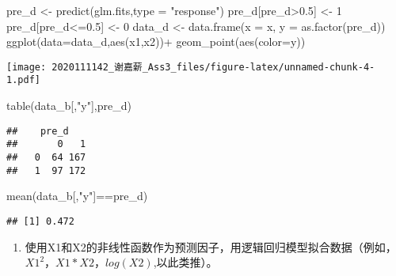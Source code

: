 \documentclass[
]{article}
\newenvironment{Shaded}{\begin{snugshade}}{\end{snugshade}}
\newcommand{\AttributeTok}[1]{\textcolor[rgb]{0.77,0.63,0.00}{#1}}
\newcommand{\DecValTok}[1]{\textcolor[rgb]{0.00,0.00,0.81}{#1}}
\newcommand{\FloatTok}[1]{\textcolor[rgb]{0.00,0.00,0.81}{#1}}
\newcommand{\FunctionTok}[1]{\textcolor[rgb]{0.00,0.00,0.00}{#1}}
\newcommand{\NormalTok}[1]{#1}
\newcommand{\OtherTok}[1]{\textcolor[rgb]{0.56,0.35,0.01}{#1}}
\newcommand{\SpecialCharTok}[1]{\textcolor[rgb]{0.00,0.00,0.00}{#1}}
\newcommand{\StringTok}[1]{\textcolor[rgb]{0.31,0.60,0.02}{#1}}
\providecommand{\tightlist}{%
  \setlength{\itemsep}{0pt}\setlength{\parskip}{0pt}}
\begin{document}
\begin{Shaded}
\begin{Highlighting}[]
\NormalTok{pre\_d }\OtherTok{\textless{}{-}} \FunctionTok{predict}\NormalTok{(glm.fits,}\AttributeTok{type =} \StringTok{"response"}\NormalTok{)}
\NormalTok{pre\_d[pre\_d}\SpecialCharTok{\textgreater{}}\FloatTok{0.5}\NormalTok{] }\OtherTok{\textless{}{-}} \DecValTok{1}
\NormalTok{pre\_d[pre\_d}\SpecialCharTok{\textless{}=}\FloatTok{0.5}\NormalTok{] }\OtherTok{\textless{}{-}} \DecValTok{0}
\NormalTok{data\_d }\OtherTok{\textless{}{-}} \FunctionTok{data.frame}\NormalTok{(}\AttributeTok{x =}\NormalTok{ x, }\AttributeTok{y =} \FunctionTok{as.factor}\NormalTok{(pre\_d))}
\FunctionTok{ggplot}\NormalTok{(}\AttributeTok{data=}\NormalTok{data\_d,}\FunctionTok{aes}\NormalTok{(x1,x2))}\SpecialCharTok{+}
  \FunctionTok{geom\_point}\NormalTok{(}\FunctionTok{aes}\NormalTok{(}\AttributeTok{color=}\NormalTok{y))}
\end{Highlighting}
\end{Shaded}

\texttt{[image: 2020111142\_谢嘉薪\_Ass3\_files/figure-latex/unnamed-chunk-4-1.pdf]}

\begin{Shaded}
\begin{Highlighting}[]
\FunctionTok{table}\NormalTok{(data\_b[,}\StringTok{"y"}\NormalTok{],pre\_d)}
\end{Highlighting}
\end{Shaded}

\begin{verbatim}
##    pre_d
##       0   1
##   0  64 167
##   1  97 172
\end{verbatim}

\begin{Shaded}
\begin{Highlighting}[]
\FunctionTok{mean}\NormalTok{(data\_b[,}\StringTok{"y"}\NormalTok{]}\SpecialCharTok{==}\NormalTok{pre\_d)}
\end{Highlighting}
\end{Shaded}

\begin{verbatim}
## [1] 0.472
\end{verbatim}

\begin{enumerate}
\def\labelenumi{(\alph{enumi})}
\setcounter{enumi}{4}
\tightlist
\item
  使用X1和X2的非线性函数作为预测因子，用逻辑回归模型拟合数据（例如，\(X1^2\)，\(X1*X2\)，\(log(X2)\),以此类推）。
\end{enumerate}
\end{document}
